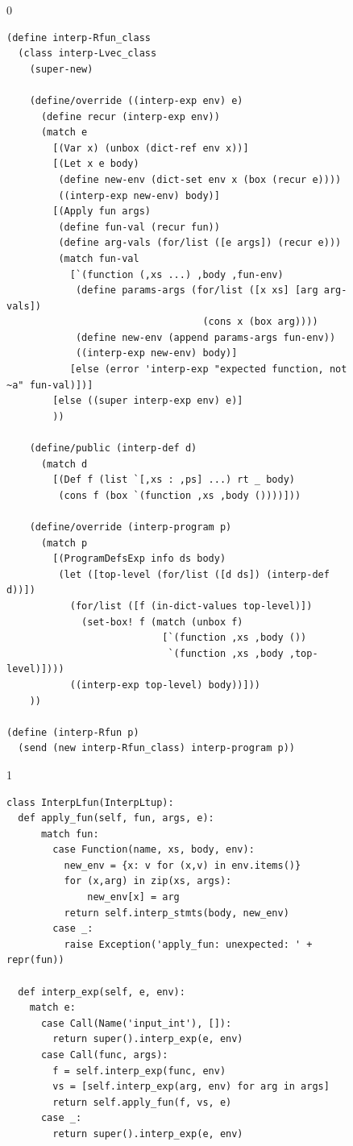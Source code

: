 \documentclass[7x10]{TimesAPriori_MIT}%
\def\racketEd{0}
\def\pythonEd{1}
\def\edition{1}
\begin{document}
\begin{figure}[tp]
{\if\edition\racketEd  
\begin{lstlisting}
(define interp-Rfun_class
  (class interp-Lvec_class
    (super-new)

    (define/override ((interp-exp env) e)
      (define recur (interp-exp env))
      (match e
        [(Var x) (unbox (dict-ref env x))]
        [(Let x e body)
         (define new-env (dict-set env x (box (recur e))))
         ((interp-exp new-env) body)]
        [(Apply fun args)
         (define fun-val (recur fun))
         (define arg-vals (for/list ([e args]) (recur e)))
         (match fun-val
           [`(function (,xs ...) ,body ,fun-env)
            (define params-args (for/list ([x xs] [arg arg-vals])
                                  (cons x (box arg))))
            (define new-env (append params-args fun-env))
            ((interp-exp new-env) body)]
           [else (error 'interp-exp "expected function, not ~a" fun-val)])]
        [else ((super interp-exp env) e)]
        ))

    (define/public (interp-def d)
      (match d
        [(Def f (list `[,xs : ,ps] ...) rt _ body)
         (cons f (box `(function ,xs ,body ())))]))

    (define/override (interp-program p)
      (match p
        [(ProgramDefsExp info ds body)
         (let ([top-level (for/list ([d ds]) (interp-def d))])
           (for/list ([f (in-dict-values top-level)])
             (set-box! f (match (unbox f)
                           [`(function ,xs ,body ())
                            `(function ,xs ,body ,top-level)])))
           ((interp-exp top-level) body))]))
    ))

(define (interp-Rfun p)
  (send (new interp-Rfun_class) interp-program p))
\end{lstlisting}
\fi}
{\if\edition\pythonEd
\begin{lstlisting}
class InterpLfun(InterpLtup):
  def apply_fun(self, fun, args, e):
      match fun:
        case Function(name, xs, body, env):
          new_env = {x: v for (x,v) in env.items()}
          for (x,arg) in zip(xs, args):
              new_env[x] = arg
          return self.interp_stmts(body, new_env)
        case _:
          raise Exception('apply_fun: unexpected: ' + repr(fun))
    
  def interp_exp(self, e, env):
    match e:
      case Call(Name('input_int'), []):
        return super().interp_exp(e, env)      
      case Call(func, args):
        f = self.interp_exp(func, env)
        vs = [self.interp_exp(arg, env) for arg in args]
        return self.apply_fun(f, vs, e)
      case _:
        return super().interp_exp(e, env)


\end{lstlisting}}
\end{figure}
\end{document}
